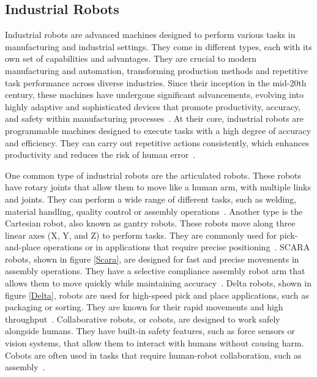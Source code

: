 

\subsection{Industrial Robots}\label{IR}
Industrial robots are advanced machines designed to perform various tasks in manufacturing and industrial settings. They come in different types, each with its own set of capabilities and advantages. They are crucial to modern manufacturing and automation, transforming production methods and repetitive task performance across diverse industries. Since their inception in the mid-20th century, these machines have undergone significant advancements, evolving into highly adaptive and sophisticated devices that promote productivity, accuracy, and safety within manufacturing processes~\cite{Ji.2019}.
At their core, industrial robots are programmable machines designed to execute tasks with a high degree of accuracy and efficiency. They can carry out repetitive actions consistently, which enhances productivity and reduces the risk of human error~\cite{Siciliano.2016}. 



One common type of industrial robots are the articulated robots. These robots have rotary joints that allow them to move like a human arm, with multiple links and joints. They can perform a wide range of different tasks, such as welding, material handling, quality control or assembly operations~\cite{Hanafusa.1981, Jain.2019}. Another type is the Cartesian robot, also known as gantry robots. These robots move along three linear axes (X, Y, and Z) to perform tasks. They are commonly used for pick-and-place operations or in applications that require precise positioning~\cite{Kim.2003}. SCARA robots, shown in figure \ref{Scara}, are designed for fast and precise movements in assembly operations. They have a selective compliance assembly robot arm that allows them to move quickly while maintaining accuracy~\cite{Das.2005}. Delta robots, shown in figure \ref{Delta}, robots are used for high-speed pick and place applications, such as packaging or sorting. They are known for their rapid movements and high throughput~\cite{bonev2001delta}. Collaborative robots, or cobots, are designed to work safely alongside humans. They have built-in safety features, such as force sensors or vision systems, that allow them to interact with humans without causing harm. Cobots are often used in tasks that require human-robot collaboration, such as assembly~\cite{Liu.2022b}.



